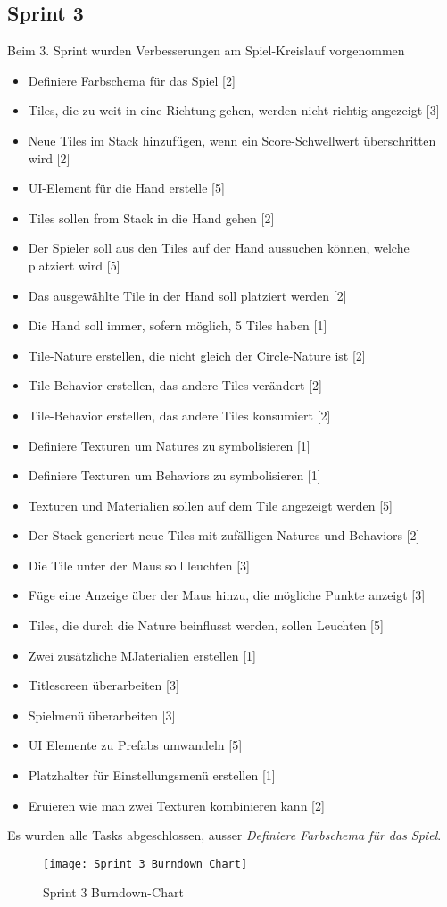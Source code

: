 \documentclass[../main.tex]{subfiles}
\begin{document}
	\newpage
	\subsection{Sprint 3}
	
	\par Beim 3. Sprint wurden Verbesserungen am Spiel-Kreislauf vorgenommen
	
	\begin{itemize}
		\item Definiere Farbschema für das Spiel [2]
		\item Tiles, die zu weit in eine Richtung gehen, werden nicht richtig angezeigt [3]
		\item Neue Tiles im Stack hinzufügen, wenn ein Score-Schwellwert überschritten wird [2]
		\item UI-Element für die Hand erstelle [5]
		\item Tiles sollen from Stack in die Hand gehen [2]
		\item Der Spieler soll aus den Tiles auf der Hand aussuchen können, welche platziert wird [5]
		\item Das ausgewählte Tile in der Hand soll platziert werden [2]
		\item Die Hand soll immer, sofern möglich, 5 Tiles haben [1]
		\item Tile-Nature erstellen, die nicht gleich der Circle-Nature ist [2]
		\item Tile-Behavior erstellen, das andere Tiles verändert [2]
		\item Tile-Behavior erstellen, das andere Tiles konsumiert [2]
		\item Definiere Texturen um Natures zu symbolisieren [1]
		\item Definiere Texturen um Behaviors zu symbolisieren [1]
		\item Texturen und Materialien sollen auf dem Tile angezeigt werden [5]
		\item Der Stack generiert neue Tiles mit zufälligen Natures und Behaviors [2]
		\item Die Tile unter der Maus soll leuchten [3]
		\item Füge eine Anzeige über der Maus hinzu, die mögliche Punkte anzeigt [3]
		\item Tiles, die durch die Nature beinflusst werden, sollen Leuchten [5]
		\item Zwei zusätzliche MJaterialien erstellen [1]
		\item Titlescreen überarbeiten [3]
		\item Spielmenü überarbeiten [3]
		\item UI Elemente zu Prefabs umwandeln [5]
		\item Platzhalter für Einstellungsmenü erstellen [1]
		\item Eruieren wie man zwei Texturen kombinieren kann [2]

	\end{itemize} 

	\par Es wurden alle Tasks abgeschlossen, ausser \emph{Definiere Farbschema für das Spiel}. 
	
	\begin{figure}[H]
		\centering
		\texttt{[image: Sprint\_3\_Burndown\_Chart]}
		\caption{Sprint 3 Burndown-Chart}
	\end{figure}
\end{document}
